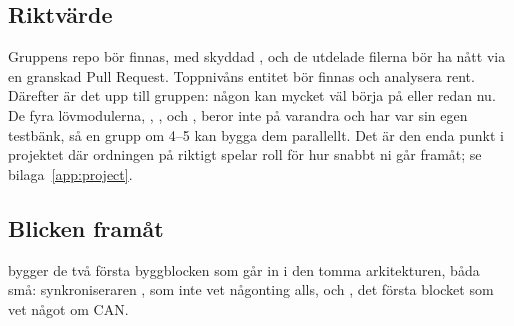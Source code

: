\subsection*{Riktvärde}
Gruppens repo bör finnas, med skyddad , och de utdelade filerna bör ha nått 
via en granskad Pull Request. Toppnivåns entitet bör finnas och analysera rent. Därefter är det upp
till gruppen: någon kan mycket väl börja på  eller  redan nu. De fyra
lövmodulerna, , ,  och , beror
inte på varandra och har var sin egen testbänk, så en grupp om 4--5 kan bygga dem parallellt. Det
är den enda punkt i projektet där ordningen på riktigt spelar roll för hur snabbt ni går framåt; se
bilaga~\ref{app:project}.

\subsection*{Blicken framåt}
 bygger de två första byggblocken som går in i den tomma arkitekturen, båda små:
synkroniseraren , som inte vet någonting alls, och , det första
blocket som vet något om CAN.
